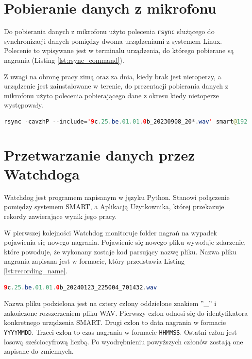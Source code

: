 \documentclass{sprz}
\begin{document}
\section{Pobieranie danych z mikrofonu}
Do pobierania danych z mikrofonu użyto polecenia \verb|rsync| służącego do synchronizacji danych pomiędzy dwoma urządzeniami z systemem Linux. Polecenie to wpisywane jest w terminalu urządzenia, do którego pobierane są nagrania (Listing \ref{lst:rsync_command}).

Z uwagi na obronę pracy zimą oraz za dnia, kiedy brak jest nietoperzy, a urządzenie jest zainstalowane w terenie, do prezentacji pobierania danych z mikrofonu użyto polecenia pobierającego dane z okresu kiedy nietoperze występowały.

\begin{lstlisting}[language=Java,caption={Polecenie rsync pobierające dane z pewnego okresu czasu}, label={lst:rsync_command}]
  rsync -cavzhP --include='9c.25.be.01.01.0b_20230908_20*.wav' smart@192.168.3.2:/var/www/html/storage/devices/9c.25.be.01.01.0b/data/wav/ /home/batmonit/batmonit/recordings/
\end{lstlisting}

\section{Przetwarzanie danych przez Watchdoga}

Watchdog jest programem napisanym w języku Python. Stanowi połączenie pomiędzy systemem SMART, a Aplikacją Użytkownika, której przekazuje rekordy zawierające wynik jego pracy.

W pierwszej kolejności Watchdog monitoruje folder nagrań na wypadek pojawienia się nowego nagrania. Pojawienie się nowego pliku wywołuje zdarzenie, które powoduje, że wykonany zostaje kod parsujący nazwę pliku. Nazwa pliku nagrania zapisana jest w formacie, który przedstawia Listing \ref{lst:recording_name}.

\begin{lstlisting}[language=Java,caption={Przykładowa nazwa pliku nagrania}, label={lst:recording_name}]
  9c.25.be.01.01.0b_20240123_225004_701432.wav
\end{lstlisting}

Nazwa pliku podzielona jest na cztery człony oddzielone znakiem ”\_” i zakończone rozszerzeniem pliku WAV. Pierwszy człon odnosi się do identyfikatora konkretnego urządzenia SMART. Drugi człon to data nagrania w formacie \verb|YYYYMMDD|. Trzeci człon to czas nagrania w formacie \verb|HHMMSS|. Ostatni człon jest losową sześciocyfrową liczbą. Po wyodrębnieniu powyższych członów zostają one zapisane do zmiennych.
\end{document}
